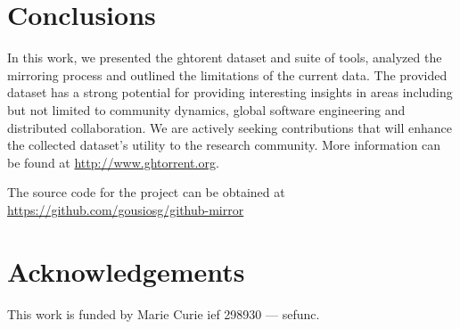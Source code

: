 \documentclass[conference]{IEEEtran}
\begin{document}
\section{Conclusions}

In this work, we presented the {\sc ght}orent dataset and suite of tools, analyzed
the mirroring process and outlined the limitations of the current data.  The
provided dataset has a strong potential for providing interesting insights in
areas including but not limited to community dynamics, global software
engineering and distributed collaboration. We are actively seeking contributions
that will enhance the collected dataset's utility to the research community. 
More information can be found at \url{http://www.ghtorrent.org}.

The source code for the project can be obtained at \url{https://github.com/gousiosg/github-mirror}

\section*{Acknowledgements}
This work is funded by Marie Curie {\sc ief} 298930 --- {\sc sefunc}.



\end{document}

